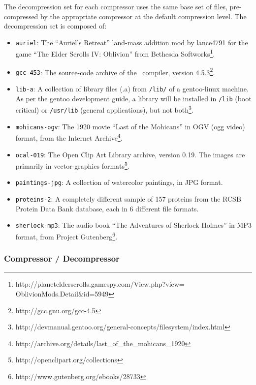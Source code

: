 The decompression set for each compressor uses the same base set of files, pre-compressed by the appropriate compressor at the default compression level.  The decompression set is composed of:
\begin{itemize}
\item {\tt auriel}: The ``Auriel's Retreat'' land-mass addition mod by lance4791 for the game ``The Elder Scrolls IV: Oblivion'' from Bethesda Softworks\footnote{http://planetelderscrolls.gamespy.com/View.php?view=\\ \hspace*{150 pt}OblivionMods.Detail\&id=5949}.

\item {\tt gcc-453}: The source-code archive of the \gcc\ compiler, version 4.5.3\footnote{http://gcc.gnu.org/gcc-4.5}.

\item {\tt lib-a}: A collection of library files (.a) from {\tt /lib/} of a gentoo-linux machine.  As per the gentoo development guide, a library will be installed in {\tt /lib} (boot critical) or {\tt /usr/lib} (general applications), but not both\footnote{http://devmanual.gentoo.org/general-concepts/filesystem/index.html}.

\item {\tt mohicans-ogv}: The 1920 movie ``Last of the Mohicans'' in OGV (ogg video) format, from the Internet Archive\footnote{http://archive.org/details/last\_of\_the\_mohicans\_1920}.

\item {\tt ocal-019}: The Open Clip Art Library archive, version 0.19. The images are primarily in vector-graphics formats\footnote{http://openclipart.org/collections}.

\item {\tt paintings-jpg}: A collection of watercolor paintings, in JPG format.

\item {\tt proteins-2}: A completely different sample of 157 proteins from the RCSB Protein Data Bank database, each in 6 different file formats.

\item {\tt sherlock-mp3}: The audio book ``The Adventures of Sherlock Holmes'' in MP3 format, from Project Gutenberg\footnote{http://www.gutenberg.org/ebooks/28733}.

\end{itemize}

\subsubsection{Compressor / Decompressor}

